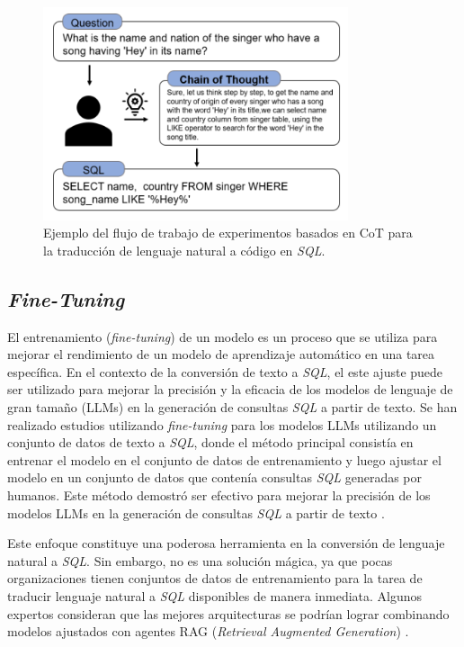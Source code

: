 \begin{figure}[H]\label{fslpromtpsql}
	\centering
	\includegraphics[width = 0.8\textwidth]{./Graphics/cotpromptsql}
	\caption{Ejemplo del flujo de trabajo de experimentos basados en CoT para la traducción de lenguaje natural a código en \textit{SQL}.}
\end{figure}

\subsection{\textit{Fine-Tuning}} \label{llm_approach_finetunig}

El entrenamiento (\textit{fine-tuning}) de un modelo es un proceso que se utiliza para mejorar el rendimiento de un modelo de aprendizaje automático en una tarea específica. En el contexto de la conversión de texto a \textit{SQL}, el este ajuste puede ser utilizado para mejorar la precisión y la eficacia de los modelos de lenguaje de gran tamaño (LLMs) en la generación de consultas \textit{SQL} a partir de texto. Se han realizado estudios  utilizando \textit{fine-tuning} para los modelos LLMs utilizando un conjunto de datos de texto a \textit{SQL}, donde el método principal consistía en entrenar el modelo en el conjunto de datos de entrenamiento y luego ajustar el modelo en un conjunto de datos que contenía consultas \textit{SQL} generadas por humanos. Este método demostró ser efectivo para mejorar la precisión de los modelos LLMs en la generación de consultas \textit{SQL} a partir de texto \cite{finetuningtext2sql}.

Este enfoque constituye una poderosa herramienta  en la conversión de lenguaje natural a \textit{SQL}. Sin embargo, no es una solución mágica, ya que pocas organizaciones tienen conjuntos de datos de entrenamiento para la tarea de traducir lenguaje natural a \textit{SQL} disponibles de manera inmediata. Algunos expertos consideran que las mejores arquitecturas se podrían lograr combinando modelos ajustados con agentes RAG (\textit{Retrieval Augmented Generation}) \cite{raginfo}.

